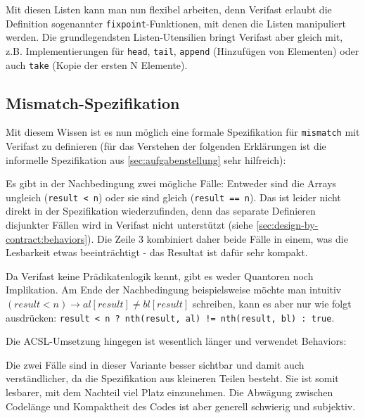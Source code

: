 Mit diesen Listen kann man nun flexibel arbeiten, denn Verifast erlaubt die Definition sogenannter
\lstinline{fixpoint}-Funktionen, mit denen die Listen manipuliert werden. Die grundlegendsten
Listen-Utensilien bringt Verifast aber gleich mit, z.B. Implementierungen für \lstinline{head}, 
\lstinline{tail}, \lstinline{append} (Hinzufügen von Elementen) oder auch \lstinline{take} 
(Kopie der ersten N Elemente).



\subsection{Mismatch-Spezifikation}

Mit diesem Wissen ist es nun möglich eine formale Spezifikation für \lstinline{mismatch} mit Verifast
zu definieren (für das Verstehen der folgenden Erklärungen ist die informelle Spezifikation aus 
\ref{sec:aufgabenstellung} sehr hilfreich):



Es gibt in der Nachbedingung zwei mögliche Fälle: Entweder sind die Arrays ungleich
(\lstinline{result < n}) oder sie sind gleich (\lstinline{result == n}). Das ist leider nicht direkt
in der Spezifikation wiederzufinden, denn das separate Definieren disjunkter Fällen wird in Verifast 
nicht unterstützt (siehe \ref{sec:design-by-contract:behaviors}). Die Zeile 3 kombiniert daher beide Fälle 
in einem, was die Lesbarkeit etwas beeinträchtigt - das Resultat ist dafür sehr kompakt.

Da Verifast keine Prädikatenlogik kennt, gibt es weder Quantoren noch Implikation. Am Ende der
Nachbedingung beispielsweise möchte man intuitiv \((result < n) \rightarrow al[result] \neq  bl[result]\)
schreiben, kann es aber nur wie folgt ausdrücken: 
\lstinline{result < n ? nth(result, al) != nth(result, bl) : true}.

Die ACSL-Umsetzung hingegen ist wesentlich länger und verwendet Behaviors:



Die zwei Fälle sind in dieser Variante besser sichtbar und damit auch verständlicher, da die Spezifikation
aus kleineren Teilen besteht. Sie ist somit lesbarer, mit dem Nachteil viel Platz einzunehmen.
Die Abwägung zwischen Codelänge und Kompaktheit des Codes ist aber generell schwierig und subjektiv.


